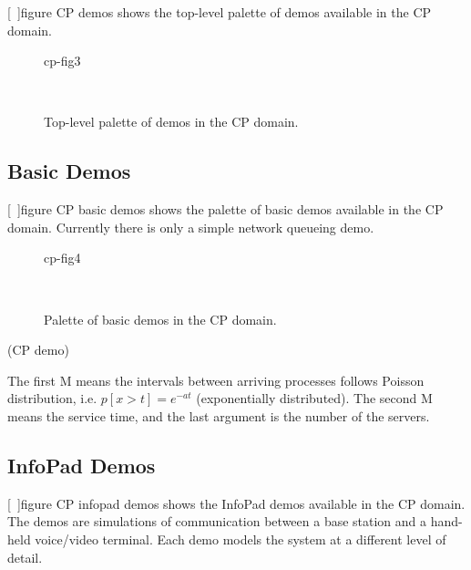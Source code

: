 [~\Ref]{figure CP demos} shows the top-level palette of demos
available in the CP domain.

\begin{figure}
\begin{gif}{cp-fig3}
\begin{center}
\ 
\end{center}
\caption{Top-level palette of demos in the CP domain.}
\label{figure CP demos}
\end{gif}
\end{figure}

\subsection{Basic Demos}
\label{CP Basic Demos}

[~\Ref]{figure CP basic demos} shows the palette of basic demos
available in the CP domain.  Currently there is only a simple network
queueing demo.

\begin{figure}
\begin{gif}{cp-fig4}
\begin{center}
\ 
\end{center}
\caption{Palette of basic demos in the CP domain.}
\label{figure CP basic demos}
\end{gif}
\end{figure}

\begin{indexlist}{ (CP demo)}
\begin{tex}
The first M means the intervals between arriving processes
follows Poisson distribution, i.e.  $ p[x > t] = e^{-at} $
(exponentially distributed).  The second M means the service time, and
the last argument is the number of the servers.
\end{tex}
\end{indexlist}

\subsection{InfoPad Demos}
\label{CP InfoPad Demos}

[~\Ref]{figure CP infopad demos} shows the InfoPad
 demos available in the CP domain.  The demos are
simulations of communication between a base station and a hand-held
voice/video terminal.  Each demo models the system at a different level
of detail.

